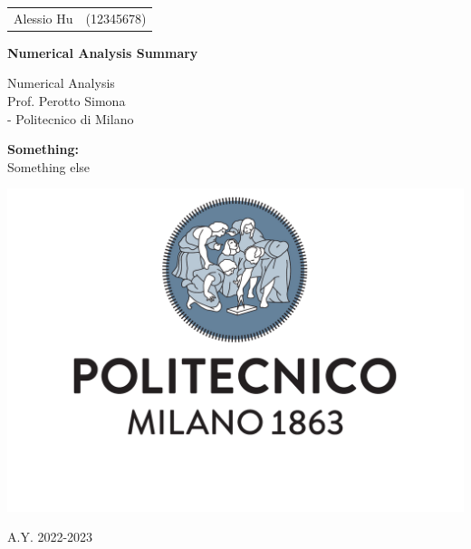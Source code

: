 \documentclass[a4paper, 11pt]{article}
\begin{document}
\begin{titlepage}
	\centering
    \begin{tabular}{rl}
        Alessio Hu & (12345678)
    \end{tabular}

    \vspace{1.5cm}
    {\Huge \textbf{Numerical Analysis Summary\\}}
    \vspace{1.5cm}
    {\large 
        Numerical Analysis \\
        Prof. Perotto Simona \\ 
		 - Politecnico di Milano \par
    }
    \vspace{1.5cm}
    {\large \textbf{Something:}\\
    \vspace{0.5cm}
    Something else}
    \par
    \vspace{3cm}
    \includegraphics[scale=0.4]{images/logo.pdf}
    \par
    \vspace{3cm}
	A.Y. 2022-2023
\end{titlepage}

\tableofcontents
    
    
    
    
    
    
\end{document}

